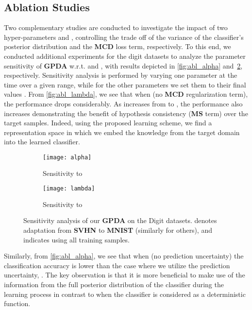 \documentclass[10pt,letterpaper]{article}
\begin{document}
\subsection{Ablation Studies}\label{ablation}
Two complementary studies are conducted to investigate the impact of two hyper-parameters  and , controlling the trade off of the variance of the classifier's posterior distribution and the \textbf{MCD} loss term, respectively.
To this end, we conducted additional experiments for the digit datasets to analyze the parameter sensitivity of \textbf{GPDA} w.r.t.  and , with results depicted in \autoref{fig:abl_alpha} and~\ref{fig:abl_lambda}, respectively. 
Sensitivity analysis is performed by varying one parameter at the time over a given range, while for the other parameters we set them to their final values . From \autoref{fig:abl_lambda}, we see that when  (no \textbf{MCD} regularization term), the performance drops considerably. As  increases from  to , the performance also increases demonstrating the benefit of hypothesis consistency (\textbf{MS} term) over the target samples. Indeed, using the proposed learning scheme, we find a representation space in which we embed the knowledge from the target domain into the learned classifier.
\begin{figure}[t]
    \centering
        \begin{subfigure}[t]{.45\linewidth}
            \texttt{[image: alpha]}
            \caption{Sensitivity to \label{fig:abl_alpha}}
        \end{subfigure}
        \begin{subfigure}[t]{.45\linewidth}
         \texttt{[image: lambda]}
        \caption{Sensitivity to \label{fig:abl_lambda}}
        \end{subfigure}
	\vspace{-0.7em}
	\caption{Sensitivity analysis of our \textbf{GPDA} on the Digit datasets.  denotes adaptation from \textbf{SVHN} to \textbf{MNIST} (similarly for others), and  indicates using all training samples.}\label{fig:abl}
\vspace{-0.5em}
\end{figure}


Similarly, from \autoref{fig:abl_alpha}, we see that when  (no prediction uncertainty) the classification accuracy is lower than the case where we utilize the prediction uncertainty, .
The key observation is that it is more beneficial to make use of the information from the full posterior distribution of the classifier during the learning process in contrast to when the classifier is considered as a deterministic function. 
\end{document}
